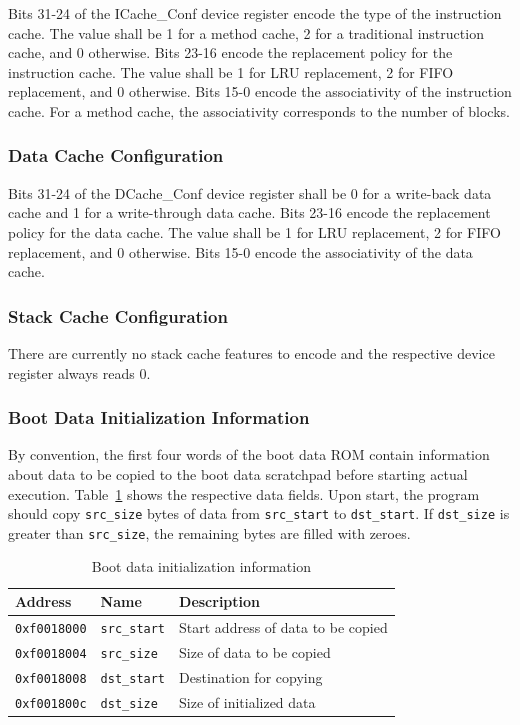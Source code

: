 \documentclass[a4paper,fontsize=10pt,twoside,DIV15,BCOR12mm,headinclude=true,footinclude=false,pagesize,bibtotoc]{scrbook}
\newcommand{\code}[1]{{\texttt{#1}}}
\begin{document}
Bits 31-24 of the ICache\_Conf device register encode the type of the
instruction cache. The value shall be 1 for a method cache, 2 for a
traditional instruction cache, and 0 otherwise. Bits 23-16 encode the
replacement policy for the instruction cache. The value shall be 1 for
LRU replacement, 2 for FIFO replacement, and 0 otherwise. Bits 15-0
encode the associativity of the instruction cache. For a method cache,
the associativity corresponds to the number of blocks.

\subsubsection{Data Cache Configuration}

Bits 31-24 of the DCache\_Conf device register shall be 0 for a
write-back data cache and 1 for a write-through data cache. Bits 23-16
encode the replacement policy for the data cache. The value shall be 1
for LRU replacement, 2 for FIFO replacement, and 0 otherwise. Bits
15-0 encode the associativity of the data cache.

\subsubsection{Stack Cache Configuration}

There are currently no stack cache features to encode and the
respective device register always reads 0.

\subsubsection{Boot Data Initialization Information}

By convention, the first four words of the boot data ROM contain
information about data to be copied to the boot data scratchpad before
starting actual execution. Table~\ref{tab:bootrommap} shows the
respective data fields. Upon start, the program should copy
\code{src\_size} bytes of data from \code{src\_start} to
\code{dst\_start}. If \code{dst\_size} is greater than
\code{src\_size}, the remaining bytes are filled with zeroes.

\begin{table}
\centering
\begin{tabular}{lll}
\toprule
Address & Name & Description \\
\midrule
\code{0xf0018000} & \code{src\_start} & Start address of data to be copied \\
\code{0xf0018004} & \code{src\_size} & Size of data to be copied \\
\code{0xf0018008} & \code{dst\_start} & Destination for copying \\
\code{0xf001800c} & \code{dst\_size} & Size of initialized data \\
\bottomrule
\end{tabular}
\caption{Boot data initialization information}
\label{tab:bootrommap}
\end{table}
\end{document}
